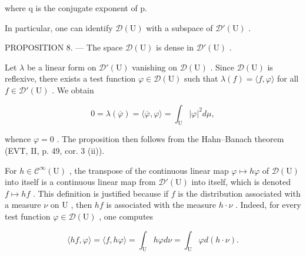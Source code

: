 where q is the conjugate exponent of p.

In particular, one can identify \(\mathcal{D}(\mathrm{U})\) with a subspace of \(\mathcal{D}'(\mathrm{U})\) .

PROPOSITION 8. --- The space \(\mathcal{D}(\mathrm{U})\) is dense in \(\mathcal{D}'(\mathrm{U})\) .

Let \(\lambda\) be a linear form on \(\mathcal{D}'(\mathrm{U})\) vanishing on \(\mathcal{D}(\mathrm{U})\) . Since \(\mathcal{D}(\mathrm{U})\) is reflexive, there exists a test function \(\varphi \in \mathcal{D}(\mathrm{U})\) such that \(\lambda(f) = \langle f, \varphi \rangle\) for all \(f \in \mathcal{D}'(\mathrm{U})\) . We obtain

\[
0 = \lambda (\overline {{\varphi}}) = \langle \overline {{\varphi}}, \varphi \rangle = \int_ {\mathrm{U}} | \varphi | ^ {2} d \mu ,
\]

whence \(\varphi = 0\) . The proposition then follows from the Hahn--Banach theorem (EVT, II, p. 49, cor. 3 (ii)).

For \(h \in \mathcal{C}^{\infty}(\mathrm{U})\) , the transpose of the continuous linear map \(\varphi \mapsto h\varphi\) of \(\mathcal{D}(\mathrm{U})\) into itself is a continuous linear map from \(\mathcal{D}'(\mathrm{U})\) into itself, which is denoted \(f \mapsto hf\) . This definition is justified because if \(f\) is the distribution associated with a measure \(\nu\) on \(\mathrm{U}\) , then \(hf\) is associated with the measure \(h \cdot \nu\) . Indeed, for every test function \(\varphi \in \mathcal{D}(\mathrm{U})\) , one computes

\[
\langle h f, \varphi \rangle = \langle f, h \varphi \rangle = \int_ {\mathrm{U}} h \varphi d \nu = \int_ {\mathrm{U}} \varphi d (h \cdot \nu).
\]

